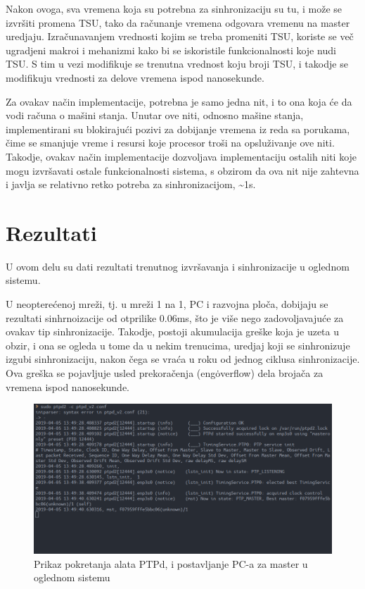\documentclass[a4paper,12pt, master]{etf}
\begin{document}
	Nakon ovoga, sva vremena koja su potrebna za sinhronizaciju su tu, i
	mo\v{z}e se izvr\v{s}iti promena TSU, tako da ra\v{c}unanje vremena
	odgovara vremenu na master uredjaju. Izra\v{c}unavanjem vrednosti kojim se
	treba promeniti TSU, koriste se ve\v{c} ugradjeni makroi i mehanizmi kako
	bi se iskoristile funkcionalnosti koje nudi TSU\@. S tim u vezi modifikuje
	se trenutna vrednost koju broji TSU, i takodje se modifikuju vrednosti za
	delove vremena ispod nanosekunde.

	Za ovakav na\v{c}in implementacije, potrebna je samo jedna nit, i to ona
	koja \'{c}e da vodi ra\v{c}una o ma\v{s}ini stanja. Unutar ove niti,
	odnosno ma\v{s}ine stanja, implementirani su blokiraju\'{c}i pozivi za
	dobijanje vremena iz reda sa porukama, \v{c}ime se smanjuje vreme i resursi
	koje procesor tro\v{s}i na opslu\v{z}ivanje ove niti. Takodje, ovakav
	na\v{c}in implementacije dozvoljava implementaciju ostalih niti koje mogu
	izvr\v{s}avati ostale funkcionalnosti sistema, s obzirom da ova nit nije
	zahtevna i javlja se relativno retko potreba za sinhronizacijom,
    \textasciitilde 1s.

	\section{Rezultati}

	U ovom delu su dati rezultati trenutnog izvr\v{s}avanja i sinhronizacije u
    oglednom sistemu.

	U neoptere\'{c}enoj mre\v{z}i, tj\@. u mre\v{z}i 1 na 1, PC i razvojna
	plo\v{c}a, dobijaju se rezultati sinhrnoizacije od otprilike 0.06ms,
	\v{s}to je vi\v{s}e nego zadovoljavaju\'{c}e za ovakav tip sinhronizacije.
	Takodje, postoji akumulacija gre\v{s}ke koja je uzeta u obzir, i ona se
	ogleda u tome da u nekim trenucima, uredjaj koji se	sinhronizuje izgubi
    sinhronizaciju, nakon \v{c}ega se vra\'{c}a u roku od jednog ciklusa
	sinhronizacije. Ova gre\v{s}ka se pojavljuje usled prekora\v{c}enja
	(eng\. overflow) dela broja\v{c}a za vremena ispod nanosekunde.

	\begin{figure}[htb]
			\centering
			\includegraphics[scale=1.0]{../pic/ptpd_startup.png}
            \caption{Prikaz pokretanja alata PTPd, i postavljanje PC-a za
            master u oglednom sistemu}
			\label{fig:ptpd_startup}
	\end{figure}
\end{document}
